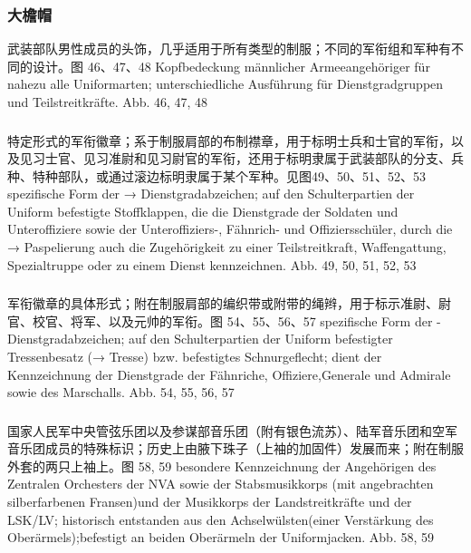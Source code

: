 \subsubsection*{大檐帽}%

武装部队男性成员的头饰，几乎适用于所有类型的制服；不同的军衔组和军种有不同的设计。图 46、47、48
Kopfbedeckung männlicher Armeeangehöriger für nahezu alle Uniformarten; unterschiedliche Ausführung für Dienstgradgruppen und Teilstreitkräfte. Abb. 46, 47, 48

\subsubsection*{}%

特定形式的军衔徽章；系于制服肩部的布制襟章，用于标明士兵和士官的军衔，以及见习士官、见习准尉和见习尉官的军衔，还用于标明隶属于武装部队的分支、兵种、特种部队，或通过滚边标明隶属于某个军种。见图49、50、51、52、53
spezifische Form der → Dienstgradabzeichen; auf den Schulterpartien der Uniform befestigte Stoffklappen, die die Dienstgrade der Soldaten und Unteroffiziere sowie der Unteroffiziers-, Fähnrich- und Offiziersschüler, durch die → Paspelierung auch die Zugehörigkeit zu einer Teilstreitkraft, Waffengattung, Spezialtruppe oder zu einem Dienst kennzeichnen. Abb. 49, 50, 51, 52, 53

\subsubsection*{}%

军衔徽章的具体形式；附在制服肩部的编织带或附带的绳辫，用于标示准尉、尉官、校官、将军、以及元帅的军衔。图 54、55、56、57
spezifische Form der - Dienstgradabzeichen; auf den Schulterpartien der Uniform befestigter Tressenbesatz (→ Tresse) bzw. befestigtes Schnurgeflecht; dient der Kennzeichnung der Dienstgrade der Fähnriche, Offiziere,Generale und Admirale sowie des Marschalls. Abb. 54, 55, 56, 57

\subsubsection*{}%

国家人民军中央管弦乐团以及参谋部音乐团（附有银色流苏）、陆军音乐团和空军音乐团成员的特殊标识；历史上由腋下珠子（上袖的加固件）发展而来；附在制服外套的两只上袖上。图 58, 59
besondere Kennzeichnung der Angehörigen des Zentralen Orchesters der NVA sowie der Stabsmusikkorps (mit angebrachten silberfarbenen Fransen)und der Musikkorps der Landstreitkräfte und der LSK/LV; historisch entstanden aus den Achselwülsten(einer Verstärkung des Oberärmels);befestigt an beiden Oberärmeln der Uniformjacken. Abb. 58, 59

